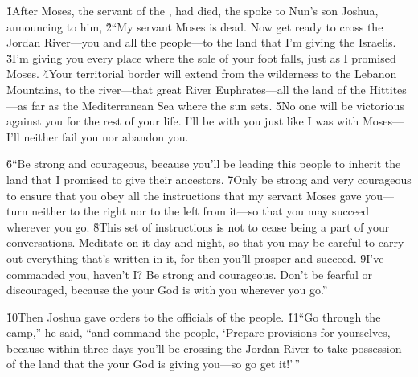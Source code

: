


\v{1}After Moses, the servant of the , had died, the  spoke to Nun's son Joshua, announcing to him, \v{2}``My servant Moses is dead. Now get ready to cross the Jordan River---you and all the people---to the land that I'm giving the Israelis. \v{3}I'm giving you every place where the sole of your foot falls, just as I promised Moses. \v{4}Your territorial border will extend from the wilderness to the Lebanon Mountains, to the river---that great River Euphrates---all the land of the Hittites---as far as the Mediterranean Sea where the sun sets. \v{5}No one will be victorious against you for the rest of your life. I'll be with you just like I was with Moses---I'll neither fail you nor abandon you.

\v{6}``Be strong and courageous, because you'll be leading this people to inherit the land that I promised to give their ancestors. \v{7}Only be strong and very courageous to ensure that you obey all the instructions that my servant Moses gave you---turn neither to the right nor to the left from it---so that you may succeed wherever you go. \v{8}This set of instructions is not to cease being a part of your conversations. Meditate on it day and night, so that you may be careful to carry out everything that's written in it, for then you'll prosper and succeed. \v{9}I've commanded you, haven't I? Be strong and courageous. Don't be fearful or discouraged, because the  your God is with you wherever you go.''

\v{10}Then Joshua gave orders to the officials of the people. \v{11}``Go through the camp,'' he said, ``and command the people, `Prepare provisions for yourselves, because within three days you'll be crossing the Jordan River to take possession of the land that the  your God is giving you---so go get it!'\,''

